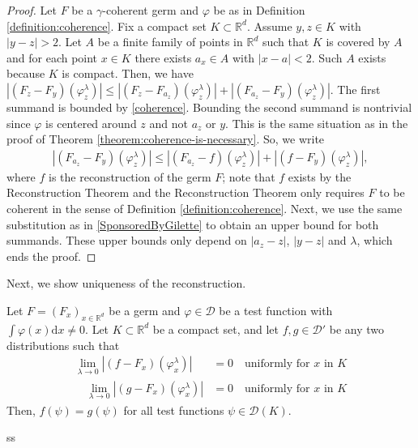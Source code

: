 \begin{proof}
    Let $F$ be a $\gamma$-coherent germ and $\varphi$ be as in Definition \ref{definition:coherence}. Fix a compact set $K \subset \mathbb{R}^d$. Assume $y,z \in K$ with $|y-z| > 2$. Let $A$ be a finite family of points in $\mathbb{R}^d$ such that $K$ is covered by $A$ and for each point $x \in K$ there exists $a_x \in A$ with $|x-a| < 2$. Such $A$ exists because $K$ is compact. Then, we have $|(F_z - F_y)(\varphi^\lambda_z)| \leq |(F_z - F_{a_z})(\varphi^\lambda_z)| + |(F_{a_z} - F_y)(\varphi^\lambda_z)|$. The first summand is bounded by \eqref{coherence}. Bounding the second summand is nontrivial since $\varphi$ is centered around $z$ and not $a_z$ or $y$. This is the same situation as in the proof of Theorem \ref{theorem:coherence-is-necessary}. So, we write
    \begin{align*}
        |(F_{a_z} - F_y)(\varphi^\lambda_z)| \leq |(F_{a_z} - f)(\varphi^\lambda_z)| + |(f - F_y)(\varphi^\lambda_z)|,
    \end{align*}
    where $f$ is the reconstruction of the germ $F$; note that $f$ exists by the Reconstruction Theorem and the Reconstruction Theorem only requires $F$ to be coherent in the sense of Definition \ref{definition:coherence}. Next, we use the same substitution as in \eqref{SponsoredByGilette} to obtain an upper bound for both summands. These upper bounds only depend on $|a_z - z|$, $|y - z|$ and $\lambda$, which ends the proof.  
\end{proof}

Next, we show uniqueness of the reconstruction. 

\begin{theorem}[Uniqueness]\label{theorem:uniqueness-reconstruction}
   Let $F = (F_x)_{x \in \mathbb{R}^d}$ be a germ and $\varphi \in \mathcal{D}$ be a test function with $\int \varphi(x) \mathrm{d}x \neq 0$. Let $K \subset \mathbb{R}^d$ be a compact set, and let $f, g \in \mathcal{D}'$ be any two distributions such that
   \begin{align*}
       \lim_{\lambda \to 0} |(f-F_x)(\varphi^\lambda_x)| &= 0 \quad \text{uniformly for $x$ in $K$} \\ 
       \quad \lim_{\lambda \to 0} |(g-F_x)(\varphi^\lambda_x)| &= 0 \quad \text{uniformly for $x$ in $K$}
   \end{align*} 
    Then, $f(\psi) = g(\psi)$ for all test functions $\psi \in \mathcal{D}(K)$.  
\end{theorem}

ss

